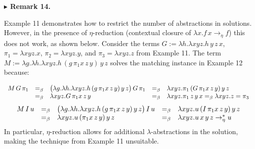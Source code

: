 \documentclass[10pt,a4paper]{amsart}
\begin{document}
 
 
\par\medskip\noindent\textbf{$\blacktriangleright$ Remark 14.}\par
 
 
Example 11 demonstrates how to restrict the number of abstractions in solutions. However, in the presence of $\eta$-reduction (contextual closure of $\lambda x.f\,x\to_{\eta}f$) this does not work, as shown below. Consider the terms $G:=\lambda h.\lambda xyz.h\,y\,z\,x$, $\pi_{1}=\lambda xyz.x$, $\pi_{2}=\lambda xyz.y$, and $\pi_{3}=\lambda xyz.z$ from Example 11. The term $M:=\lambda g.\lambda h.\lambda xyz.h\,(g\,\pi_{1}x\,z\,y)\,y\,z$ solves the matching instance in Example 12 because:\par
    \[\begin{array}[t]{lclcl}M\,G\,\pi_{1}&=_{\beta}&\big{(}\lambda g.\lambda h.%
\lambda xyz.h\,(g\,\pi_{1}x\,z\,y)\,y\,z\big{)}\,G\,\pi_{1}&=_{\beta}&\lambda
xyz%
.\pi_{1}\,(G\,\pi_{1}x\,z\,y)\,y\,z\\
&=_{\beta}&\lambda xyz.G\,\pi_{1}x\,z\,y&=_{\beta}&\lambda xyz.\pi_{1}\,z\,y\,%
x=_{\beta}\lambda xyz.z=\pi_{3}\end{array}\]       \[\begin{array}[t]{lclcl}M\,I\,u&=_{\beta}&\big{(}\lambda g.\lambda h.\lambda xyz%
.h\,(g\,\pi_{1}x\,z\,y)\,y\,z\big{)}\,I\,u&=_{\beta}&\lambda xyz.u\,(I\,\pi_{1%
}x\,z\,y)\,y\,z\\
&=_{\beta}&\lambda xyz.u\,(\pi_{1}x\,z\,y)\,y\,z&=_{\beta}&\lambda xyz.u\,x\,y%
\,z\to_{\eta}^{*}u\end{array}\]    
In particular, $\eta$-reduction allows for additional $\lambda$-abstractions in the solution, making the technique from Example 11 unsuitable.\par
 
 
 
 
\end{document}
